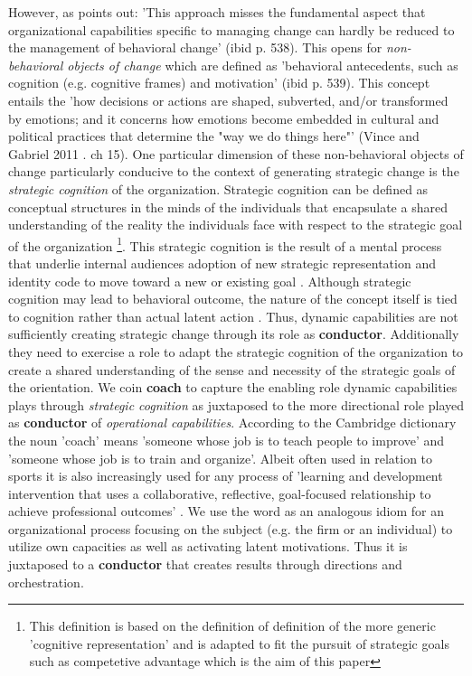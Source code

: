 \documentclass[review,fleqn]{elsarticle}\usepackage[]{graphicx}\usepackage[]{color}
\begin{document}
However, as \cite{Verona2011} points out: 'This approach misses the fundamental aspect
that organizational capabilities specific to managing change can hardly be reduced to the
management of behavioral change' (ibid p. 538). This opens for \emph{non-behavioral
  objects of change} which are defined as 'behavioral antecedents, such as cognition
(e.g. cognitive frames) and motivation' (ibid p. 539). This concept entails the 'how
decisions or actions are shaped, subverted, and/or transformed by emotions; and it
concerns how emotions become embedded in cultural and political practices that determine
the "way we do things here"' (Vince and Gabriel 2011 . ch 15). One particular dimension of
these non-behavioral objects of change particularly conducive to the context of
generating strategic change is the \emph{strategic cognition} of the
organization. Strategic cognition can be defined as conceptual structures in the minds of
the individuals that encapsulate a shared understanding of the reality the
individuals face with respect to the strategic goal of the organization \footnote{This
  definition is based on the definition of \cite{Lakoff1987} definition of the more generic
  'cognitive representation' and is adapted to fit the pursuit of strategic goals such as
  competetive advantage which is the aim of this paper}. This strategic
cognition is the result of a mental process that underlie internal
audiences adoption of new strategic representation and identity code to move toward a
new or existing goal \citep{Gavetti2012}. Although strategic cognition may lead to
behavioral outcome, the nature of the concept itself is tied to cognition rather than
actual latent action \citep{Zollo2016}. Thus, dynamic capabilities are not sufficiently
creating strategic change through its role as {\bf conductor}. Additionally they need to
exercise a role to adapt the strategic cognition of the organization to create
a shared understanding of the sense and necessity of the strategic goals of the
orientation. We coin {\bf coach} to capture the enabling role dynamic
capabilities plays through \emph{strategic cognition} as
juxtaposed to the more directional role played as {\bf conductor} of \emph{operational
  capabilities}. According to the Cambridge dictionary the noun 'coach' means 'someone
whose job is to teach people to improve' and 'someone whose job is to train and
organize'. Albeit often used in relation to sports it is also increasingly used for any
process of 'learning and development intervention that uses a collaborative, reflective, goal-focused
relationship to achieve professional outcomes' \cite[p. 253]{Jones2016}. We use the word
as an analogous idiom for an organizational process focusing on the subject (e.g. the firm or an
individual) to utilize own capacities as well as activating latent motivations. Thus it is
juxtaposed to a {\bf conductor} that creates results through directions and
orchestration.
\end{document}
